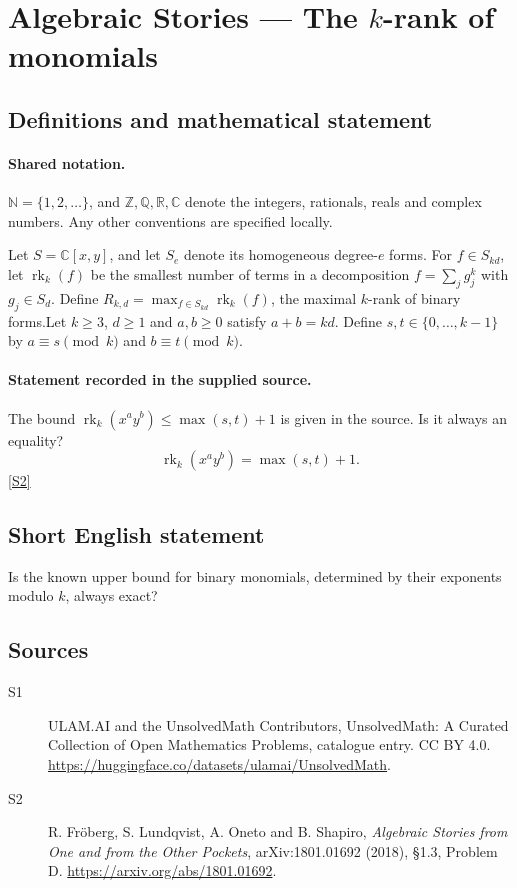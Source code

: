 \documentclass[11pt]{article}
\newcommand{\sref}[2]{\hyperlink{source:#1:#2}{[S#2]}}
\begin{document}
\section{Algebraic Stories — The $k$-rank of monomials}\label{statement}

\subsection{Definitions and mathematical statement}

\paragraph{Shared notation.}$\mathbb N=\{1,2,\ldots\}$, and $\mathbb Z,\mathbb Q,\mathbb R,\mathbb C$ denote the integers, rationals, reals and complex numbers. Any other conventions are specified locally.


Let $S=\mathbb C[x,y]$, and let $S_e$ denote its homogeneous degree-$e$ forms. For $f\in S_{kd}$, let $\operatorname{rk}_k(f)$ be the smallest number of terms in a decomposition $f=\sum_jg_j^k$ with $g_j\in S_d$. Define $R_{k,d}=\max_{f\in S_{kd}}\operatorname{rk}_k(f)$, the maximal $k$-rank of binary forms.Let $k\geq3$, $d\geq1$ and $a,b\geq0$ satisfy $a+b=kd$. Define $s,t\in\{0,\ldots,k-1\}$ by $a\equiv s\pmod k$ and $b\equiv t\pmod k$.
\paragraph{Statement recorded in the supplied source.}
The bound $\operatorname{rk}_k(x^ay^b)\leq\max(s,t)+1$ is given in the source. Is it always an equality?
\[\operatorname{rk}_k(x^ay^b)=\max(s,t)+1.\] \sref{statement}{2}
\subsection{Short English statement}
Is the known upper bound for binary monomials, determined by their exponents modulo $k$, always exact?
\subsection{Sources}
\begin{description}
\item[\hypertarget{source:statement:1}{S1}] ULAM.AI and the UnsolvedMath Contributors, UnsolvedMath: A Curated Collection of Open Mathematics Problems, catalogue entry. CC BY 4.0. \url{https://huggingface.co/datasets/ulamai/UnsolvedMath}.
\item[\hypertarget{source:statement:2}{S2}] R. Fröberg, S. Lundqvist, A. Oneto and B. Shapiro, \emph{Algebraic Stories from One and from the Other Pockets}, arXiv:1801.01692 (2018), §1.3, Problem D. \url{https://arxiv.org/abs/1801.01692}.
\end{description}
\label{end:statement}
\end{document}
